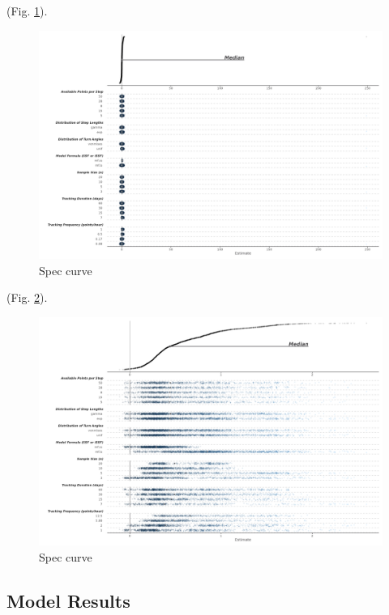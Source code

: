 \documentclass[10pt,a4paper]{article}
\begin{document}
(Fig. \ref{fig:specCurveTwoStep}).

\begin{figure}
\includegraphics[width=1\linewidth]{../figures/twoStep_specCurve} \caption{Spec curve}\label{fig:specCurveTwoStep}
\end{figure}

(Fig. \ref{fig:specCurvePois}).

\begin{figure}
\includegraphics[width=1\linewidth]{../figures/pois_specCurve} \caption{Spec curve}\label{fig:specCurvePois}
\end{figure}

\hypertarget{model-results}{%
\subsection{Model Results}\label{model-results}}
\end{document}
